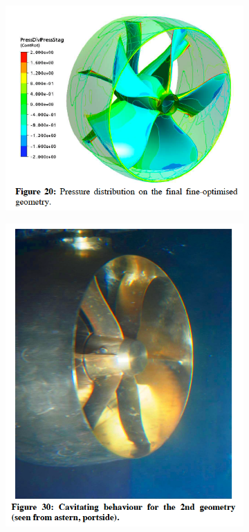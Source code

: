 \documentclass{article}\usepackage[]{graphicx}\usepackage[]{color}
\begin{document}
\begin{figure}[h]

\begin{subfigure}{0.5\textwidth}
\includegraphics[width=0.9\linewidth]{FineOptimised.png}
\caption{}
\end{subfigure}
\begin{subfigure}{0.5\textwidth}
\includegraphics[width=0.9\linewidth]{FineCavitation.png}
\caption{}
\end{subfigure}


\end{figure}
\end{document}
